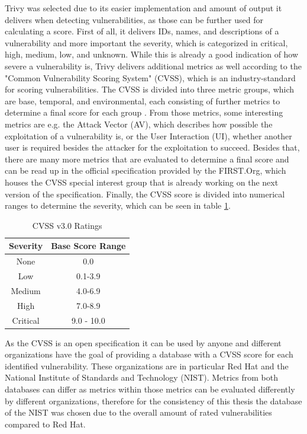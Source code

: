 Trivy was selected due to its easier implementation and amount of output it delivers when detecting vulnerabilities, as those can be further used for calculating a score. First of all, it delivers IDs, names, and descriptions of a vulnerability and more important the severity, which is categorized in critical, high, medium, low, and unknown. While this is already a good indication of how severe a vulnerability is, Trivy delivers additional metrics as well according to the "Common Vulnerability Scoring System" (CVSS), which is an industry-standard for scoring vulnerabilities. The CVSS is divided into three metric groups, which are base, temporal, and environmental, each consisting of further metrics to determine a final score for each group .
From those metrics, some interesting metrics are e.g. the Attack Vector (AV), which describes how possible the exploitation of a vulnerability is, or the User Interaction (UI), whether another user is required besides the attacker for the exploitation to succeed. Besides that, there are many more metrics that are evaluated to determine a final score and can be read up in the official specification provided by the FIRST.Org, which houses the CVSS special interest group that is already working on the next version of the specification.
Finally, the CVSS score is divided into numerical ranges to determine the severity, which can be seen in table \ref{cvss_table}.
\begin{table}[h!]
    \centering
    \begin{tabular}{ |c|c| }
    \hline
    Severity & Base Score Range \\
    \hline
         None & 0.0 \\
         Low & 0.1-3.9\\
         Medium & 4.0-6.9\\
         High & 7.0-8.9\\
         Critical & 9.0 - 10.0\\
    \hline
    \end{tabular}
    \caption{CVSS v3.0 Ratings}
    \label{cvss_table}
\end{table}

As the CVSS is an open specification it can be used by anyone and different organizations have the goal of providing a database with a CVSS score for each identified vulnerability. These organizations are in particular Red Hat and the National Institute of Standards and Technology (NIST). Metrics from both databases can differ as metrics within those metrics can be evaluated differently by different organizations, therefore for the consistency of this thesis the database of the NIST was chosen due to the overall amount of rated vulnerabilities compared to Red Hat.
